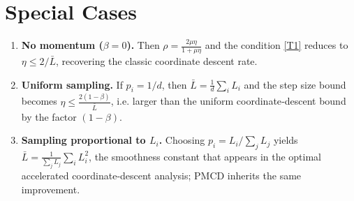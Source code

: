 \documentclass{article}
\begin{document}
\section*{Special Cases}
\begin{enumerate}[label=\arabic*.]
\item \textbf{No momentum ($\beta=0$).}  
Then $\rho=\frac{2\mu\eta}{1+\mu\eta}$ and the condition \eqref{T1}
reduces to $\eta\le 2/\bar L$, recovering the classic coordinate descent rate.
\item \textbf{Uniform sampling.}  
If $p_i=1/d$, then $\bar L=\frac{1}{d}\sum_i L_i$ and the step size bound
becomes $\eta\le \frac{2(1-\beta)}{\bar L}$, i.e. larger than the uniform
coordinate‑descent bound by the factor $(1-\beta)$.
\item \textbf{Sampling proportional to $L_i$.}  
Choosing $p_i=L_i/\sum_j L_j$ yields $\bar L=\frac{1}{\sum_j L_j}\sum_i L_i^{2}$,
the smoothness constant that appears in the optimal accelerated
coordinate‑descent analysis; PMCD inherits the same improvement.
\end{enumerate}

\end{document}
